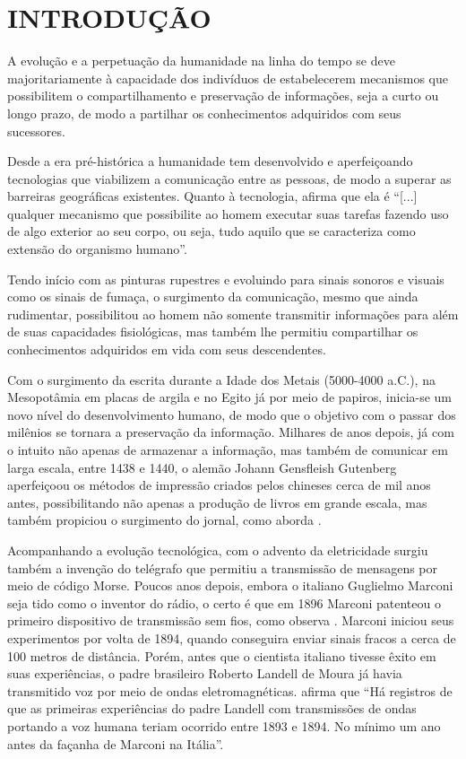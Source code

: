 \section{INTRODUÇÃO}


A evolução e a perpetuação da humanidade na linha do tempo se deve
majoritariamente à capacidade dos indivíduos de estabelecerem
mecanismos que possibilitem o compartilhamento e preservação de
informações, seja a curto ou longo prazo, de modo a partilhar os
conhecimentos adquiridos com seus sucessores.

Desde a era pré-histórica a humanidade tem desenvolvido e
aperfeiçoando tecnologias que viabilizem a comunicação entre as
pessoas, de modo a superar as barreiras geográficas existentes.
Quanto à tecnologia, 
afirma que ela é “[...] qualquer mecanismo que possibilite ao homem
executar suas tarefas fazendo uso de algo exterior ao seu corpo, ou
seja, tudo aquilo que se caracteriza como extensão do organismo humano”.

Tendo início com as pinturas rupestres e evoluindo para sinais
sonoros e visuais como os sinais de fumaça, o surgimento da
comunicação, mesmo que ainda rudimentar, possibilitou ao homem não
somente transmitir informações para além de suas capacidades
fisiológicas, mas também lhe permitiu compartilhar os conhecimentos
adquiridos em vida com seus descendentes.

Com o surgimento da escrita durante a Idade dos Metais (5000-4000
a.C.), na Mesopotâmia em placas de argila e no Egito já por meio de
papiros, inicia-se um novo nível do desenvolvimento humano, de modo
que o objetivo com o passar dos milênios se tornara a preservação da
informação. Milhares de anos depois, já com o intuito não apenas de
armazenar a informação, mas também de comunicar em larga escala,
entre 1438 e 1440, o alemão Johann Gensfleish Gutenberg aperfeiçoou
os métodos de impressão criados pelos chineses cerca de mil anos
antes, possibilitando não apenas a produção de livros em grande
escala, mas também propiciou o surgimento do jornal, como aborda
.

Acompanhando a evolução tecnológica, com o advento da eletricidade
surgiu também a invenção do telégrafo que permitiu a transmissão de
mensagens por meio de código Morse. Poucos anos depois, embora o
italiano Guglielmo Marconi seja tido como o inventor do rádio, o
certo é que em 1896 Marconi patenteou o primeiro dispositivo de
transmissão sem fios, como observa .
Marconi iniciou seus experimentos por volta de 1894, quando
conseguira enviar sinais fracos a cerca de 100 metros de distância.
Porém, antes que o cientista italiano tivesse êxito em suas experiências, o
padre brasileiro Roberto Landell de Moura já havia transmitido voz por meio de
ondas eletromagnéticas. 
afirma que “Há registros de que as primeiras experiências do padre
Landell com transmissões de ondas portando a voz humana teriam
ocorrido entre 1893 e 1894. No mínimo um ano antes da façanha de
Marconi na Itália”.


